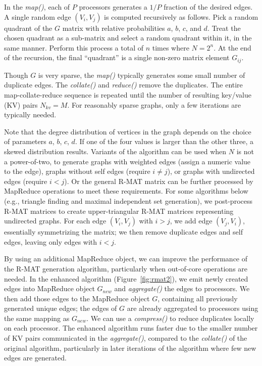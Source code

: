 In the {\it map()}, each of $P$ processors generates a $1/P$ fraction
of the desired edges.  A single random edge $(V_i,V_j)$ is computed
recursively as follows.  Pick a random quadrant of the $G$ matrix with
relative probabilities $a$, $b$, $c$, and $d$.  Treat the chosen
quadrant as a sub-matrix and select a random quadrant within it, in
the same manner.  Perform this process a total of $n$ times where $N = 2^n$.  At
the end of the recursion, the final ``quadrant'' is a single non-zero
matrix element $G_{ij}$.

Though $G$ is very sparse, the {\it map()} typically generates some
small number of duplicate edges.  The {\it collate()} and {\it
reduce()} remove the duplicates.  The entire map-collate-reduce
sequence is repeated until the number of resulting key/value (KV)
pairs $N_{kv} = M$.  For reasonably sparse graphs,
only a few iterations are typically needed.

Note that the degree distribution of vertices in the graph depends on
the choice of parameters $a$, $b$, $c$, $d$.  If one of the four
values is larger than the other three, a skewed distribution results.
Variants of the algorithm can be used when $N$ is not a power-of-two,
to generate graphs with weighted edges (assign a numeric value to the
edge), graphs without self edges (require $i \ne j$), or graphs with
undirected edges (require $i < j$).  Or the general R-MAT matrix can
be further processed by MapReduce operations to meet these
requirements.  For some algorithms below (e.g., triangle finding and
maximal independent set generation), we post-process R-MAT matrices to
create upper-triangular R-MAT matrices representing undirected graphs.
For each edge $(V_i,V_j)$ with $i > j$, we add edge $(V_j,V_i)$,
essentially symmetrizing the matrix; we then remove duplicate edges
and self edges, leaving only edges with $i < j$.

By using an additional MapReduce object, we can improve the
performance of the R-MAT generation algorithm, particularly when
out-of-core operations are needed.  In the enhanced algorithm
(Figure~\ref{fig:rmat2}), we emit newly created edges into MapReduce
object $G_{new}$ and {\it aggregate()} the edges to processors.  We
then add those edges to the MapReduce object $G$, containing all
previously generated unique edges; the edges of $G$ are already
aggregated to processors using the same mapping as $G_{new}$.  We can
use a {\it compress()} to reduce duplicates locally on each processor.
The enhanced algorithm runs faster due to the smaller number of KV
pairs communicated in the {\it aggregate()}, compared to the {\it
collate()} of the original algorithm, particularly in later iterations
of the algorithm where few new edges are generated.

